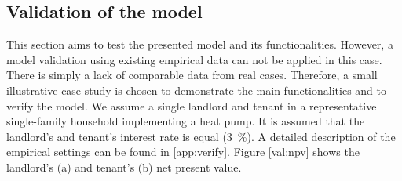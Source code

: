 \subsection{Validation of the model}\label{met:validate}
This section aims to test the presented model and its functionalities. However, a model validation using existing empirical data can not be applied in this case. There is simply a lack of comparable data from real cases. Therefore, a small illustrative case study is chosen to demonstrate the main functionalities and to verify the model. We assume a single landlord and tenant in a representative single-family household implementing a heat pump. It is assumed that the landlord's and tenant's interest rate is equal (\SI{3}{\%}). A detailed description of the empirical settings can be found in \ref{app:verify}. Figure \ref{val:npv} shows the landlord's (a) and tenant's (b) net present value. 

